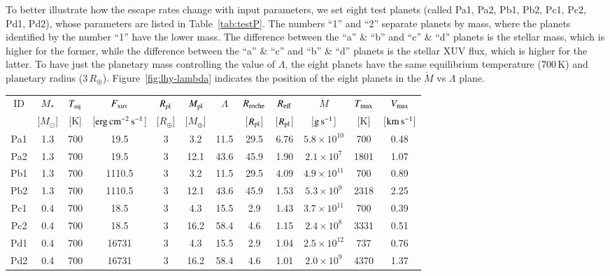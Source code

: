 \documentclass{aa}
\def\roche{$R_{\rm roche}$}
\def\ergscm{$\rm erg\,cm^{-2}\,s^{-1}$}
\def\Teq{$T_{\rm eq}$}
\def\Rpl{$R_{\rm pl}$}
\def\Mpl{$M_{\rm pl}$}
\def\Re{\ensuremath{R_{\oplus}}}
\def\Me{\ensuremath{M_{\oplus}}}
\def\Mo{\ensuremath{M_{\odot}}}
\def\gs{$\rm g\,s^{-1}$}
\def\kms{$\rm km\,s^{-1}$}
\begin{document}
To better illustrate how the escape rates change with input parameters, we set eight test planets (called Pa1, Pa2, Pb1, Pb2, Pc1, Pc2, Pd1, Pd2), whose parameters are listed in Table~\ref{tab:testP}. The numbers ``1'' and ``2'' separate planets by mass, where the planets identified by the number ``1'' have the lower mass. The difference between the ``a'' \& ``b'' and ``c'' \& ``d'' planets is the stellar mass, which is higher for the former, while the difference between the ``a'' \& ``c'' and ``b'' \& ``d'' planets is the stellar XUV flux, which is higher for the latter. To have just the planetary mass controlling the value of $\Lambda$, the eight planets have the same equilibrium temperature (700\,K) and planetary radius (3\,\Re). Figure~\ref{fig:lhy-lambda} indicates the position of the eight planets in the $\dot{M}$ vs $\Lambda$ plane.
\begin{table*}
\caption{Test planets considered for the discussion of the results. The Roche radius here is defined from the center of the planet.}
\label{tab:testP}
\centering
\begin{tabular}{c|c|c|c|c|c|c|c|c|c|c|c}
  \hline
  \hline
  ID & $M_*$ & \Teq & $F_{\rm xuv}$ & \Rpl & \Mpl & $\Lambda$ & \roche & $R_{\rm eff}$ & $\dot{M}$ & $T_{\rm max}$ & $V_{\rm max}$ \\
     & [\Mo] & [K]  & [\ergscm]     & [\Re]& [\Me]&           & [\Rpl] & [\Rpl]        & [\gs]     & [K]           & [\kms]        \\
  \hline
  Pa1 & 1.3 & 700 & 19.5    & 3 & 3.2  & 11.5 & 29.5 & 6.76 & $5.8\times10^{10}$ & 700  & 0.48 \\
  Pa2 & 1.3 & 700 & 19.5    & 3 & 12.1 & 43.6 & 45.9 & 1.90 & $2.1\times10^7$    & 1801 & 1.07 \\
  Pb1 & 1.3 & 700 & 1110.5  & 3 & 3.2  & 11.5 & 29.5 & 4.09 & $4.9\times10^{11}$ & 700  & 0.89 \\
  Pb2 & 1.3 & 700 & 1110.5   & 3 & 12.1 & 43.6 & 45.9 & 1.53 & $5.3\times10^9$    & 2318 & 2.25 \\
  Pc1 & 0.4 & 700 & 18.5    & 3 & 4.3  & 15.5 & 2.9  & 1.43 & $3.7\times10^{11}$ & 700  & 0.39 \\
  Pc2 & 0.4 & 700 & 18.5    & 3 & 16.2 & 58.4 & 4.6  & 1.15 & $2.4\times10^8$    & 3331 & 0.51 \\
  Pd1 & 0.4 & 700 & 16731 & 3 & 4.3  & 15.5 & 2.9  & 1.04 & $2.5\times10^{12}$ & 737  & 0.76 \\
  Pd2 & 0.4 & 700 & 16731 & 3 & 16.2 & 58.4 & 4.6  & 1.01 & $2.0\times10^{9}$ & 4370 & 1.37 \\
  \hline
\end{tabular}
\end{table*}
\end{document}
